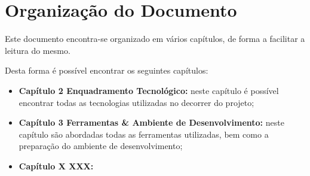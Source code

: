 \section{Organização do Documento}

Este documento encontra-se organizado em vários capítulos, de forma a facilitar a leitura do mesmo.

Desta forma é possível encontrar os seguintes capítulos:

\begin{itemize}
	\item \textbf{Capítulo 2 \textemdash Enquadramento Tecnológico:} neste capítulo é possível encontrar todas as tecnologias utilizadas no decorrer do projeto;
	\item \textbf{Capítulo 3 \textemdash Ferramentas \& Ambiente de Desenvolvimento:} neste capítulo são abordadas todas as ferramentas utilizadas, bem como a preparação do ambiente de desenvolvimento;
	\item \textbf{Capítulo X \textemdash XXX:}
\end{itemize}
